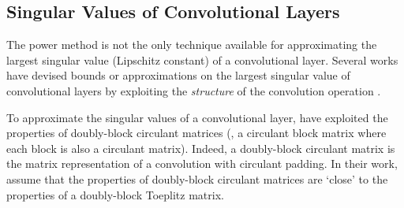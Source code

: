 \subsection{Singular Values of Convolutional Layers}
\label{subsection:ch3-singular_values_of_convolutional_layers}

The power method is not the only technique available for approximating the largest singular value (Lipschitz constant) of a convolutional layer.
Several works have devised bounds or approximations on the largest singular value of convolutional layers by exploiting the \emph{structure} of the convolution operation \cite{sedghi2018singular,bibi2019deep,singla2019bounding,jia2017improving}.

%


To approximate the singular values of a convolutional layer, \citet{sedghi2018singular} have exploited the properties of doubly-block circulant matrices (\ie, a circulant block matrix where each block is also a circulant matrix).
Indeed, a doubly-block circulant matrix is the matrix representation of a convolution with circulant padding.
In their work, \citet{sedghi2018singular} assume that the properties of doubly-block circulant matrices are `close' to the properties of a doubly-block Toeplitz matrix.

